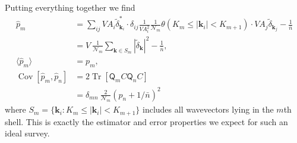 \documentclass{article}
\renewcommand{\vec}[1]{\bm{#1}}
\newcommand{\mat}[1]{\textsf{#1}}
\newcommand{\nbar}{\bar{n}}
\DeclareMathOperator{\Tr}{Tr}
\DeclareMathOperator{\Cov}{Cov}
\begin{document}
Putting everything together we find
\begin{align}
    \hat{p}_m
        &= \sum_{ij} V A_i \tilde{\delta}^*_{\vec{k}_i} \cdot \delta_{ij} \frac{1}{V A_i^2} \frac{1}{\mathcal{N}_m} \theta(K_m \le |\vec{k}_i| < K_{m+1}) \cdot V A_j \tilde{\delta}_{\vec{k}_j} - \frac{1}{\nbar} \\
        &= V~ \frac{1}{\mathcal{N}_m} \sum_{\vec{k} \in S_m} |\tilde{\delta}_{\vec{k}}|^2 - \frac{1}{\nbar}, \\
    \langle \hat{p}_m \rangle
        &= p_m, \\
    \Cov[\hat{p}_m,\hat{p}_n]
        &= 2 \Tr[\mat{Q}_m C \mat{Q}_n C] \\
        &= \delta_{mn}~ \frac{2}{\mathcal{N}_m} (p_n + 1/\nbar)^2
\end{align}
where $S_m = \{ \vec{k}_i : K_m \le |\vec{k}_i| < K_{m+1} \}$ includes all
wavevectors lying in the $m$th shell.  This is exactly the estimator and error
properties we expect for such an ideal survey.
\end{document}

